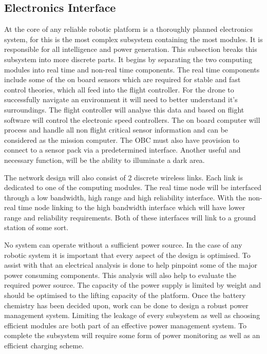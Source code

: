 		\subsection{Electronics Interface}
		At the core of any reliable robotic platform is a thoroughly planned electronics system, for \projectName this is the most complex subsystem containing the most modules. It is responsible for all intelligence and power generation. This subsection breaks this subsystem into more discrete parts. It begins by separating the two computing modules into real time and non-real time components. The real time components include some of the on board sensors which are required for stable and fast control theories, which all feed into the flight controller. For the drone to successfully navigate an environment it will need to better understand it's surroundings. The flight controller will analyse this data and based on flight software will control the electronic speed controllers. The on board computer will process and handle all non flight critical sensor information and can be considered as the mission computer. The OBC must also have provision to connect to a sensor pack via a predetermined interface. Another useful and necessary function, will be the ability to illuminate a dark area. 
		
		The network design will also consist of 2 discrete wireless links. Each link is dedicated to one of the computing modules. The real time node will be interfaced through a low bandwidth, high range and high reliability interface. With the non-real time node linking to the high bandwidth interface which will have lower range and reliability requirements. Both of these interfaces will link to a ground station of some sort.
		
		No system can operate without a sufficient power source. In the case of any robotic system it is important that every aspect of the design is optimised. To assist with that an electrical analysis is done to help pinpoint some of the major power consuming components. This analysis will also help to evaluate the required power source. The capacity of the power supply is limited by weight and should be optimised to the lifting capacity of the platform. Once the battery chemistry has been decided upon, work can be done to design a robust power management system. Limiting the leakage of every subsystem as well as choosing efficient modules are both part of an effective power management system. To complete the subsystem will require some form of power monitoring as well as an efficient charging scheme.
		
